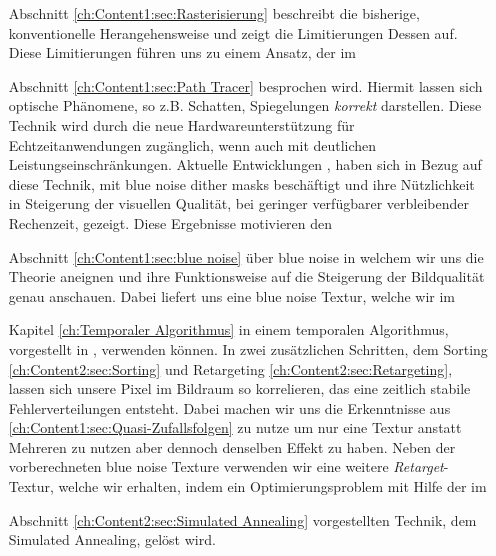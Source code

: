 \begin{itemize}
    \item[Abschnitt \ref{ch:Content1:sec:Rasterisierung}] beschreibt die bisherige, konventionelle Herangehensweise und zeigt die Limitierungen Dessen auf. Diese 
        Limitierungen führen uns zu einem Ansatz, der im 

    \item[Abschnitt \ref{ch:Content1:sec:Path Tracer}] besprochen wird. Hiermit lassen sich optische Phänomene, so z.B. Schatten, Spiegelungen \textit{korrekt} darstellen.
        Diese Technik wird durch die neue Hardwareunterstützung für Echtzeitanwendungen zugänglich, wenn auch mit deutlichen Leistungseinschränkungen.
        Aktuelle Entwicklungen \cite{georgiev2016blue}, haben sich in Bezug auf diese Technik, mit blue noise dither masks beschäftigt
        und ihre Nützlichkeit in Steigerung der visuellen Qualität, bei geringer verfügbarer verbleibender Rechenzeit, gezeigt. Diese Ergebnisse motivieren den

    \item[Abschnitt \ref{ch:Content1:sec:blue noise}] über blue noise in welchem wir uns die Theorie aneignen und ihre Funktionsweise auf die Steigerung der 
        Bildqualität genau anschauen. Dabei liefert uns \cite{bluenoisechrisschied} eine blue noise Textur, welche wir im

    \item[Kapitel \ref{ch:Temporaler Algorithmus}]in einem temporalen Algorithmus, vorgestellt in \cite{hal02158423}, verwenden können. In zwei zusätzlichen Schritten, dem 
    Sorting \ref{ch:Content2:sec:Sorting} und Retargeting \ref{ch:Content2:sec:Retargeting}, lassen sich unsere Pixel im Bildraum so korrelieren, das eine zeitlich stabile Fehlerverteilungen
    entsteht. Dabei machen wir uns die Erkenntnisse aus \ref{ch:Content1:sec:Quasi-Zufallsfolgen} zu nutze um nur eine Textur anstatt Mehreren zu nutzen aber dennoch denselben
    Effekt zu haben. Neben der vorberechneten blue noise Texture verwenden wir eine weitere \textit{Retarget}-Textur, welche wir erhalten, indem ein Optimierungsproblem 
    mit Hilfe der im  

    \item[Abschnitt \ref{ch:Content2:sec:Simulated Annealing}]vorgestellten Technik, dem Simulated Annealing, gelöst wird.   

\end{itemize}
 


\vfill
